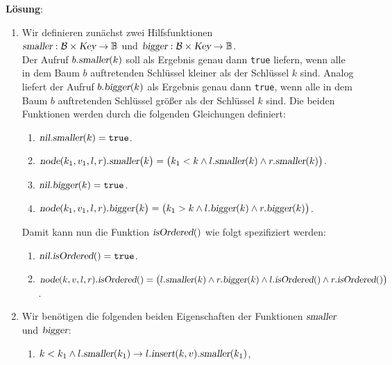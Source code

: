 \documentclass{article}
\newcommand{\solution}{\vspace*{0.2cm}

\noindent
\textbf{L\"osung}: }
\begin{document}
\solution
\begin{enumerate}
\item Wir definieren zun\"achst zwei Hilfsfunktionen
      \\[0.2cm]
      \hspace*{1.3cm} 
      $\textsl{smaller}: \mathcal{B} \times \textsl{Key} \rightarrow \mathbb{B}$ 
      \quad und \quad
      $\textsl{bigger}: \mathcal{B} \times \textsl{Key} \rightarrow \mathbb{B}$.
      \\[0.2cm]
      Der Aufruf $b.\textsl{smaller}(k)$ soll als Ergebnis genau dann \texttt{true}
      liefern, wenn alle in dem Baum $b$ auftretenden Schl\"ussel kleiner als der Schl\"ussel
      $k$ sind.  Analog liefert der Aufruf $b.\textsl{bigger}(k)$  als Ergebnis genau dann \texttt{true},
      wenn alle in dem Baum $b$ auftretenden Schl\"ussel gr\"o{\ss}er als der Schl\"ussel
      $k$ sind.  Die beiden Funktionen werden durch die folgenden Gleichungen definiert:
      \begin{enumerate}
      \item $\textsl{nil}.\textsl{smaller}(k) = \mathtt{true}$.
      \item $\textsl{node}(k_1,v_1,l,r).\textsl{smaller}\bigl(k\bigr) = 
                \bigl(k_1 < k \wedge l.\textsl{smaller}(k) \wedge r.\textsl{smaller}(k)\bigr)$.
      \item $\textsl{nil}.\textsl{bigger}(k) = \mathtt{true}$.
      \item $\textsl{node}(k_1,v_1,l,r).\textsl{bigger}\bigl(k\bigr) = 
             \bigl(k_1 > k \wedge l.\textsl{bigger}(k) \wedge r.\textsl{bigger}(k)\bigr)$.
      \end{enumerate}
      Damit kann nun die Funktion $\textsl{isOrdered}()$ wie folgt spezifiziert werden:
      \begin{enumerate}
      \item $\textsl{nil}.\textsl{isOrdered}() = \mathtt{true}$.
      \item $\textsl{node}(k,v,l,r).\textsl{isOrdered}() = 
             \bigl(l.\textsl{smaller}(k) \wedge r.\textsl{bigger}(k) 
             \wedge l.\textsl{isOrdered}() \wedge r.\textsl{isOrdered}()\bigr)
            $.
      \end{enumerate}
\item Wir ben\"otigen die folgenden beiden Eigenschaften der Funktionen $\textsl{smaller}$ und
      $\textsl{bigger}$:
      \begin{enumerate}
      \item $k < k_1 \wedge l.\textsl{smaller}(k_1) \rightarrow l.\textsl{insert}(k,v).\textsl{smaller}(k_1)$,

\end{enumerate}
\end{enumerate}
\end{document}

